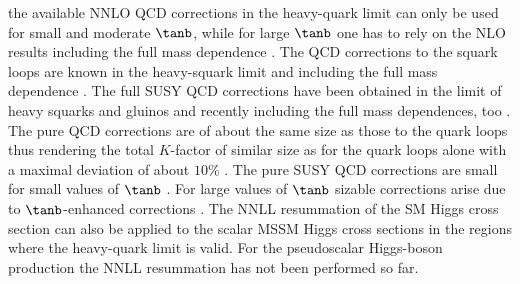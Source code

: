 the available NNLO QCD corrections in the heavy-quark limit
\cite{Harlander:2002wh,Harlander:2002vv,
Anastasiou:2002yz,Anastasiou:2002wq,Ravindran:2003um} can only be used
for small and moderate $\tanb$, while for large $\tanb$ one has to rely
on the NLO results including the full mass dependence
\cite{Graudenz:1992pv,Spira:1993bb,Spira:1995rr,
Anastasiou:2006hc,Aglietti:2006tp,Bonciani:2007ex}. The QCD corrections
to the squark loops are known in the heavy-squark limit
\cite{Dawson:1996xz} and including the full mass dependence
\cite{Muhlleitner:2006wx,Anastasiou:2006hc,
Aglietti:2006tp,Bonciani:2007ex}. The full SUSY QCD corrections have
been obtained in the limit of heavy squarks and gluinos
\cite{Harlander:2003bb,Harlander:2003kf,Harlander:2004tp,
Harlander:2005if,Degrassi:2008zj,Muhlleitner:2008yw,Degrassi:2010eu} and
recently including the full mass dependences, too
\cite{Anastasiou:2008rm,Muhlleitner:2010nm}.  The pure QCD corrections
are of about the same size as those to the quark loops thus rendering
the total $K$-factor of similar size as for the quark loops alone with a
maximal deviation of about $10\%$ \cite{Dawson:1996xz}.  The pure
SUSY QCD corrections are small for small values of $\tanb$
\cite{Harlander:2003bb,Harlander:2003kf,Harlander:2004tp,
Harlander:2005if,Anastasiou:2008rm}. For large values of $\tanb$
sizable corrections arise due to $\tanb$-enhanced corrections
\cite{Muhlleitner:2010nm,Degrassi:2010eu}. The NNLL resummation of the
SM Higgs cross section \cite{Catani:2003zt,Ravindran:2005vv,Moch:2005ky}
can also be applied to the scalar MSSM Higgs cross sections in the
regions where the heavy-quark limit is valid. For the pseudoscalar 
Higgs-boson production the NNLL resummation has not been performed so far.

